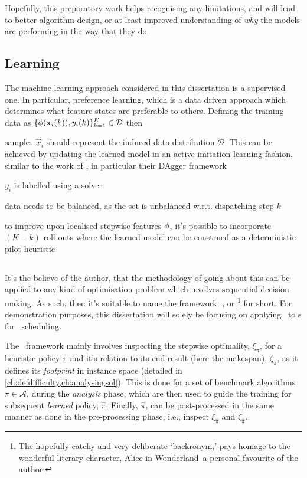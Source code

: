 Hopefully, this preparatory work helps recognising any limitations, and will 
lead to better algorithm design, or at least improved understanding of 
\emph{why} the models are performing in the way that they do.

\subsection*{Learning}
The machine learning approach considered in this dissertation is a supervised one. In particular, preference learning, which is a data driven approach which determines what feature states are preferable to others.
Defining the training data as 
$\{{\mathbf{\phi}}(\mathbf{x}_i(k)),y_i(k)\}_{k=1}^K\in\mathcal{D}$ then 
\begin{enumerate*}
    \item samples $\vec{x}_i$ should represent the induced data distribution $\mathcal{D}$. 
    This can be achieved by updating the learned model in an active imitation learning fashion, similar to the work of \cite{RossB10,RossGB11}, in particular their DAgger framework
    \item $y_i$ is labelled using a solver
    \item data needs to be balanced, as the set is unbalanced w.r.t. 
    dispatching step $k$
    \item to improve upon localised stepwise features ${\mathbf{\phi}}$, it's possible to 
    incorporate $(K-k)$ roll-outs where the learned model can be construed as a 
    deterministic pilot heuristic    
\end{enumerate*}


\subsection*{\Alice}
It's the believe of the author, that the methodology of going about this can be applied to any kind of optimisation problem which involves sequential decision making. As such, then it's suitable to name the framework:
\emph{\fullnameAlice}, or \Alice\footnote{
    The hopefully catchy and very deliberate `backronym,' pays homage to 
    the wonderful literary character, Alice in Wonderland--a personal 
    favourite of the author.} 
for short. 
For demonstration purposes, this dissertation will solely be 
focusing on applying \Alice\ to \dr s for \jsp\ scheduling.

The \Alice\ framework mainly involves inspecting the stepwise optimality, $\xi_\pi$, for a heuristic policy $\pi$ and it's relation to its end-result (here the makespan), $\zeta_{\pi}$, as it defines its \emph{footprint} in instance space (detailed in \cref{ch:defdifficulty,ch:analysingsol}). 
This is done for a set of benchmark algorithms $\pi\in\mathcal{A}$, during the 
\emph{analysis} phase, which are then used to guide the training 
for subsequent \emph{learned} policy, $\hat{\pi}$. 
Finally, $\hat{\pi}$, can be post-processed in the same manner as done in the 
pre-processing phase, i.e., inspect $\xi_{\hat{\pi}}$ and $\zeta_{\hat{\pi}}$.

